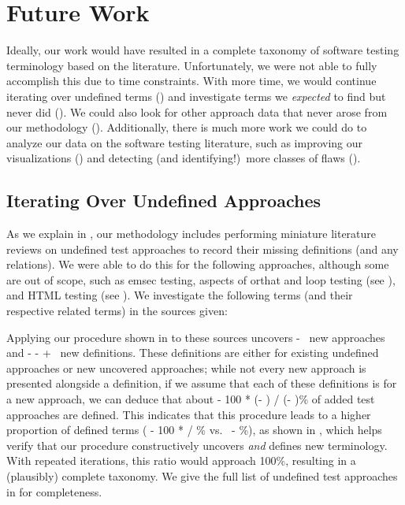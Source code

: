 \section{Future Work}\label{future-work}

Ideally, our work would have resulted in a complete taxonomy of software
testing terminology based on the literature. Unfortunately, we were not able to
fully accomplish this due to time constraints. With more time, we would
continue iterating over undefined terms () and
investigate terms we \emph{expected} to find but never did
(). We could also look for other approach data that
never arose from our methodology ().
Additionally, there is much more work we could do to analyze our data on the
software testing literature, such as improving our visualizations
() and detecting (and identifying!)\ more classes of flaws
().

\subsection{Iterating Over Undefined Approaches}\label{future-undef-terms}

As we explain in , our methodology includes performing
miniature literature reviews on undefined test approaches to record their
missing definitions (and any relations). We were able to do this for the
following approaches, although some are out of scope, such as \acf{emsec}
testing, aspects of \acf{orthat} and loop testing (see ),
and HTML testing (see ). We investigate the following terms
(and their respective related terms) in the sources given:


Applying our procedure shown in  to these sources
uncovers \the\numexpr \TotalAfter - \TotalBefore\relax\ new approaches and
\the\numexpr \TotalAfter - \UndefAfter - \TotalBefore + \UndefBefore\relax\ new
definitions. These definitions are either for existing undefined approaches or
new uncovered approaches; while not every new approach is presented alongside
a definition, if we assume that each of these definitions is for a new approach,
we can deduce that about \the{} - 100 * (\UndefAfter - \UndefBefore) /
(\TotalAfter - \TotalBefore)\relax\% of added test approaches are defined. This
indicates that this procedure leads to a higher proportion of defined terms
(\the{} - 100 * \UndefBefore / \TotalBefore\relax\% vs.~%
\the{} - \undefPerc\relax\%), as shown in
, which helps verify that our procedure constructively
uncovers \emph{and} defines new terminology. With repeated iterations, this
ratio would approach 100\%, resulting in a (plausibly) complete taxonomy. We
give the full list of undefined test approaches in  for
completeness.

